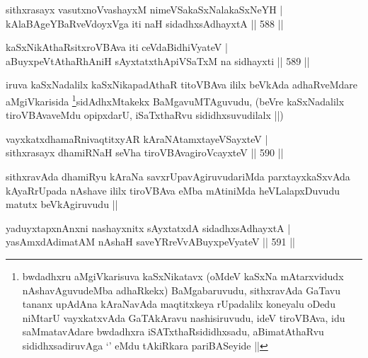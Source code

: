 \begin{shl}
sithxrasayx vasutxnoV\s vashayxM nimeVSakaSxNalakaSxNeYH | \\
kAlaBAgeYBaRveVdoyxVga iti naH sidadhxsAdhayxtA \hfill||  588 ||  
\end{shl}



\begin{shl}
kaSxNikAthaRsitxroVBAva iti ceVdaBidhiVyateV | \\
aBuyxpeVtAthaRhAniH sAyxtatxthA\s piVSaTxM na sidhayxti \hfill||  589 ||  
\end{shl}

\begin{artha}
iruva kaSxNadalilx kaSxNikapadAthaR titoVBAva ililx beVkAda adhaRveMdare aMgiVkarisida \footnote{bwdadhxru aMgiVkarisuva kaSxNikatavx (oMdeV kaSxNa mAtarxvidudx nAshavAguvudeMba adhaRkekx) BaMgabaruvudu, sithxravAda GaTavu tananx upAdAna kAraNavAda maqtitxkeya rUpadalilx koneyalu oDedu niMtarU vayxkatxvAda GaTAkAravu nashisiruvudu, ideV tiroVBAva, idu saMmatavAdare bwdadhxra iSATxthaRsididhxsadu, aBimatAthaRvu sididhxsadiruvAga `\stext' eMdu tAkiRkara pariBASeyide ||}sidAdhxMtakekx BaMgavuMTAguvudu, (beVre kaSxNadalilx tiroVBAvaveMdu opipxdarU, iSaTxthaRvu sididhxsuvudilalx ||)
\end{artha}


\begin{shl}
vayxkatxdhamaRnivaqtitxyAR kAraNAtamxtayeVSayxteV | \\
sithxrasayx dhamiRNaH seVha tiroVBAvagiroVcayxteV \hfill||  590 ||  
\end{shl}

\begin{artha}
sithxravAda dhamiRyu kAraNa savxrUpavAgiruvudariMda parxtayxkaSxvAda kAyaRrUpada nAshave ililx tiroVBAva eMba mAtiniMda heVLalapxDuvudu matutx beVkAgiruvudu ||
\end{artha}


\begin{shl}
yaduyxtapxnAnxni nashayxnitx sAyxtatxdA sidadhxsAdhayxtA | \\
yasAmxdAdimatAM nAshaH saveYRreVvABuyxpeVyateV \hfill||  591 ||  
\end{shl}

